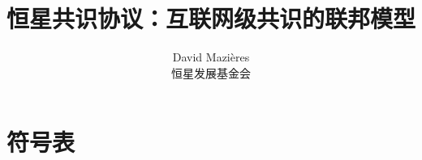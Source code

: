\documentclass[onecolumn,11pt]{article}
\title{恒星共识协议：互联网级共识的联邦模型}
\author{David Mazi{\`e}res\\恒星发展基金会}
\date{}
\begin{document}
\maketitle












%




\appendix
\section{符号表}
\label{sec:glossary}
\nobreak
\noindent
{}
\end{document}
